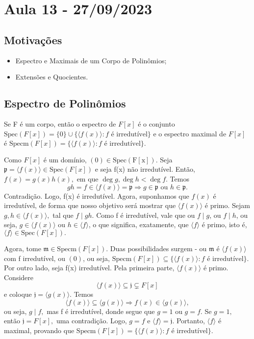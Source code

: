 \documentclass[algebraII_notes.tex]{subfiles}
\begin{document}
\section{Aula 13 - 27/09/2023}
\subsection{Motivações}
\begin{itemize}
	\item Espectro e Maximais de um Corpo de Polinômios;
	\item Extensões e Quocientes.
\end{itemize}
\subsection{Espectro de Polinômios}
\begin{prop*}
	Se F é um corpo, então o espectro de \(F[x]\) é o conjunto \(\mathrm{Spec}(F[x]) = \{0\}\cup\{\langle f(x) \rangle: f\text{ é irredutível}\}\) e o espectro maximal de
	\(F[x]\) é \(\mathrm{Specm}(F[x]) = \{\langle f(x) \rangle: f\text{ é irredutível}\}\).
\end{prop*}
\begin{proof*}
	Como \(F[x]\) é um domínio, \((0)\in \mathrm{Spec(F[x])}.\) Seja \( \mathfrak{p} = \langle f(x) \rangle\in \mathrm{Spec}(F[x])\) e seja
	f(x) não irredutível. Então, \(f(x) = g(x)h(x),\) em que \(\deg{g}, \deg{h} < \deg{f}.\) Temos
	\[
		gh = f\in \langle f(x) \rangle = \mathfrak{p} \Rightarrow g\in \mathfrak{p}\text{ ou } h\in \mathfrak{p}.
	\]
	Contradição. Logo, f(x) é irredutível. Agora, suponhamos que \(f(x)\) é irredutível, de forma que nosso objetivo será mostrar que
	\(\langle f(x) \rangle\) é primo. Sejam \(g, h \in \langle f(x) \rangle,\) tal que \(f\mid gh.\) Como f é irredutível, vale que
	ou \(f\mid g\), ou \(f\mid h\), ou seja, \(g\in \langle f(x) \rangle\) ou \(h\in \langle f \rangle\), o que significa, exatamente,
	que \(\langle f \rangle\) é primo, isto é, \(\langle f \rangle\in \mathrm{Spec}(F[x]).\)

	Agora, tome \(\mathfrak{m}\in \mathrm{Specm}(F[x]).\) Duas possibilidades surgem - ou \(\mathfrak{m}\) é \(\langle f(x) \rangle\) com f irredutível,
	ou \((0)\), ou seja, \(\mathrm{Specm}(F[x]) \subseteq{\{\langle f(x) \rangle: f\text{ é irredutível}\}}\). Por outro lado,
	seja f(x) irredutível. Pela primeira parte, \(\langle f(x) \rangle\) é primo. Considere
	\[
		\langle f(x) \rangle \subseteq{\mathfrak{j}}\subsetneq{F[x]}
	\]
	e coloque \(\mathfrak{j} = \langle g(x) \rangle.\) Temos
	\[
		\langle f(x) \rangle \subseteq{\langle g(x) \rangle} \Rightarrow f(x)\in \langle g(x) \rangle,
	\]
	ou seja, \(g\mid f,\) mas f é irredutível, donde segue que \(g=1\) ou \(g = f.\) Se \(g=1,\) então \(\mathfrak{j} = F[x],\)
	uma contradição. Logo, \(g=f\) e \(\langle f \rangle = \mathfrak{j}.\) Portanto, \(\langle f \rangle\) é maximal, provando que
	\(\mathrm{Specm}(F[x]) = \{\langle f(x) \rangle: f\text{ é irredutível}\}\). \qedsymbol
\end{proof*}
\end{document}
